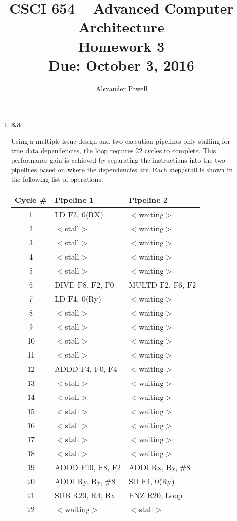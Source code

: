 \documentclass[10pt]{article} %
\title{CSCI 654 -- Advanced Computer Architecture \\
Homework 3 \\
{\large{\bf Due: October 3, 2016}}}
\date{}
\author{Alexander Powell}
\begin{document}
\maketitle
\begin{enumerate}

\item %

\textbf{3.3}

Using a multiple-issue design and two execution pipelines only stalling for true data dependencies, the loop requires $22$ cycles to complete.  This performance gain is achieved by separating the instructions into the two pipelines based on where the dependencies are.  Each step/stall is shown in the following list of operations.  

\begin{center}
\begin{tabular}{| c | l | l |}
\hline
Cycle \# & Pipeline 1 & Pipeline 2 \\
\hline
1 & LD F2, 0(RX) & $<$waiting$>$ \\
2 & $<$stall$>$ & $<$waiting$>$ \\
3 & $<$stall$>$ & $<$waiting$>$ \\
4 & $<$stall$>$ & $<$waiting$>$ \\
5 & $<$stall$>$ & $<$waiting$>$ \\
6 & DIVD F8, F2, F0 & MULTD F2, F6, F2 \\
7 & LD F4, 0(Ry) & $<$waiting$>$ \\
8 & $<$stall$>$ & $<$waiting$>$ \\
9 & $<$stall$>$ & $<$waiting$>$ \\
10 & $<$stall$>$ & $<$waiting$>$ \\
11 & $<$stall$>$ & $<$waiting$>$ \\
12 & ADDD F4, F0, F4 & $<$waiting$>$ \\
13 & $<$stall$>$ & $<$waiting$>$ \\
14 & $<$stall$>$ & $<$waiting$>$ \\
15 & $<$stall$>$ & $<$waiting$>$ \\
16 & $<$stall$>$ & $<$waiting$>$ \\
17 & $<$stall$>$ & $<$waiting$>$ \\
18 & $<$stall$>$ & $<$waiting$>$ \\
19 & ADDD F10, F8, F2 & ADDI Rx, Ry, \#8 \\
20 & ADDI Ry, Ry, \#8 & SD F4, 0(Ry) \\
21 & SUB R20, R4, Rx & BNZ R20, Loop \\
22 & $<$waiting$>$ & $<$stall$>$ \\
\hline
\end{tabular}
\end{center}


\end{enumerate}
\end{document}
